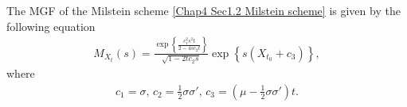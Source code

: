 \begin{theorem}
	The MGF of the Milstein scheme \eqref{Chap4 Sec1.2 Milstein scheme} is given by the following equation
	\begin{align}
	M_{X_t}(s)=\frac{\exp\left\{ \frac{c_1^2s^2t}{2-4sc_2t} \right\}}{\sqrt{1-2tc_2s}}\exp\left\{ s\left(X_{t_0}+c_3\right) \right\},
	\end{align}
	where 
	\begin{align}\label{Chap4.1.2 Milstein constants}
	c_1=\sigma,\, c_2=\frac{1}{2}\sigma\sigma',\, c_3=\left(\mu-\frac{1}{2}\sigma\sigma'\right)t.
	\end{align}
\end{theorem}

